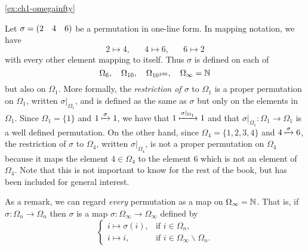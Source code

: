 \begin{solution}{\ref{ex:ch1-omegainfty}}{
    Let \(\sigma = (2 \quad 4 \quad 6)\) be a permutation in one-line form. In mapping notation, we have
    \[
    2 \mapsto 4, \hspace{20pt} 4 \mapsto 6, \hspace{20pt} 6 \mapsto 2
    \]
    with every other element mapping to itself. Thus \(\sigma\) is defined on each of
    \[
    \Omega_{6},\quad \Omega_{10},\quad \Omega_{10^{100}},\quad \Omega_{\infty} = \mathbb{N}
    \]
    but also on \(\Omega_{1}\). More formally, the \textit{restriction of \(\sigma\)} to \(\Omega_{1}\) is a proper permutation on \(\Omega_{1}\), written \(\sigma|_{\Omega_{1}}\), and is defined as the same as \(\sigma\) but only on the elements in \(\Omega_{1}\). Since \(\Omega_{1} = \{1\}\) and \(1 \xmapsto{\sigma} 1\), we have that \(1 \xmapsto{\sigma|_{\Omega_{1}}} 1\) and that \(\sigma|_{\Omega_{1}}\colon \Omega_{1} \to \Omega_{1}\) is a well defined permutation. On the other hand, since \(\Omega_{4} = \{1, 2, 3, 4\}\) and \(4 \xmapsto{\sigma} 6\), the restriction of \(\sigma\) to \(\Omega_{4}\), written \(\sigma|_{\Omega_{4}}\), is not a proper permutation on \(\Omega_{4}\) because it maps the element \(4 \in \Omega_{4}\) to the element \(6\) which is not an element of \(\Omega_{4}\). Note that this is not important to know for the rest of the book, but has been included for general interest.

    As a remark, we can regard \textit{every} permutation as a map on \(\Omega_{\infty} = \mathbb{N}\). That is, if \(\sigma\colon \Omega_{n} \to \Omega_{n}\) then \(\sigma\) is a map \(\sigma\colon \Omega_{\infty} \to \Omega_{\infty}\) defined by
    \[
    \begin{cases}
        i \mapsto \sigma(i), & \text{if \(i \in \Omega_{n}\),}\\
        i \mapsto i,         & \text{if \(i \in \Omega_{\infty}\backslash\Omega_{n}\).}
    \end{cases}
    \]
}\end{solution}

